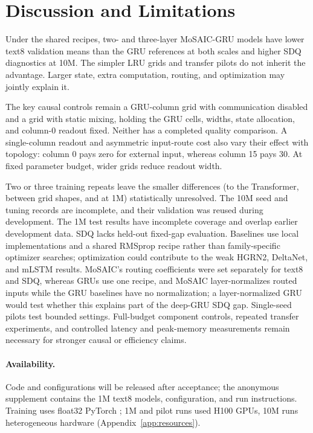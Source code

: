 \documentclass[letterpaper,twoside]{article}
\begin{document}
\section{Discussion and Limitations}\label{sec:limitations}

Under the shared recipes, two- and three-layer MoSAIC-GRU models have lower text8 validation means than the GRU references at both scales and higher SDQ diagnostics at 10M. The simpler LRU grids and transfer pilots do not inherit the advantage. Larger state, extra computation, routing, and optimization may jointly explain it.

The key causal controls remain a GRU-column grid with communication disabled and a grid with static mixing, holding the GRU cells, widths, state allocation, and column-0 readout fixed. Neither has a completed quality comparison. A single-column readout and asymmetric input-route cost also vary their effect with topology: column 0 pays zero for external input, whereas column 15 pays 30. At fixed parameter budget, wider grids reduce readout width.

Two or three training repeats leave the smaller differences (to the Transformer, between grid shapes, and at 1M) statistically unresolved. The 10M seed and tuning records are incomplete, and their validation was reused during development. The 1M test results have incomplete coverage and overlap earlier development data. SDQ lacks held-out fixed-gap evaluation. Baselines use local implementations and a shared RMSprop recipe rather than family-specific optimizer searches; optimization could contribute to the weak HGRN2, DeltaNet, and mLSTM results. MoSAIC's routing coefficients were set separately for text8 and SDQ, whereas GRUs use one recipe, and MoSAIC layer-normalizes routed inputs while the GRU baselines have no normalization; a layer-normalized GRU would test whether this explains part of the deep-GRU SDQ gap. Single-seed pilots test bounded settings. Full-budget component controls, repeated transfer experiments, and controlled latency and peak-memory measurements remain necessary for stronger causal or efficiency claims.

\paragraph{Availability.}
Code and configurations will be released after acceptance; the anonymous supplement contains the 1M text8 models, configuration, and run instructions. Training uses float32 PyTorch \citep{paszke2019pytorch}; 1M and pilot runs used H100 GPUs, 10M runs heterogeneous hardware (Appendix~\ref{app:resources}).
\end{document}
